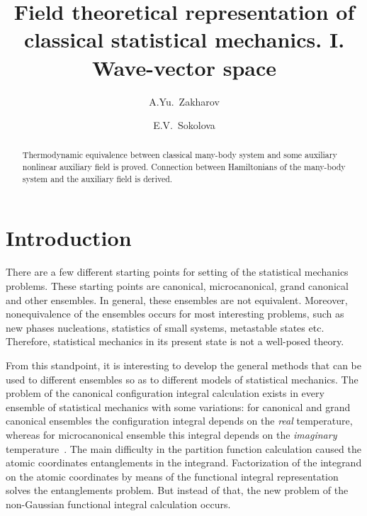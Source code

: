 \documentclass[aps,pre,preprint,floatfix,twoside,tightenlines,showpacs,
showkeys]{revtex4}
\begin{document}
%
\title{Field theoretical representation of classical statistical mechanics. I. Wave-vector space}
\author{A.Yu.~Zakharov}
\author{E.V.~Sokolova} 
%
%
\begin{abstract}
Thermodynamic equivalence between classical many-body system and some auxiliary nonlinear auxiliary field is proved. Connection between Hamiltonians of the many-body system and the auxiliary field is derived.
\end{abstract}
%
\maketitle

\section{Introduction}

There are a few different starting points for setting of the statistical mechanics problems. These starting points are canonical, microcanonical, grand canonical and other ensembles. In general, these ensembles are not equivalent. Moreover, nonequivalence of the ensembles occurs for most interesting problems, such as new phases nucleations, statistics of small systems, metastable states etc. Therefore, statistical mechanics in its present state is not a well-posed theory. 

From this standpoint, it is interesting to develop the general methods that can be used to different ensembles so as to different models of statistical mechanics. The problem of the canonical configuration integral calculation exists in every ensemble of statistical mechanics with some variations: for canonical and grand canonical ensembles the configuration integral depends on the {\em real} temperature, whereas for microcanonical ensemble this  integral depends on the {\em imaginary} temperature~\cite{Zak0}. The main difficulty in the partition function calculation caused the atomic coordinates entanglements in the integrand. Factorization of the integrand on the atomic coordinates by means of the functional integral representation solves the entanglements problem. But instead of that, the new problem of the non-Gaussian functional integral calculation occurs. 
\end{document}
